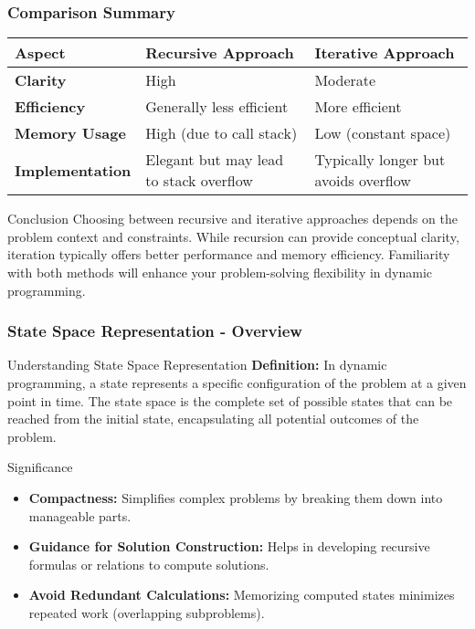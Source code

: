 \documentclass[aspectratio=169]{beamer}
\begin{document}
\begin{frame}
  \frametitle{Comparison Summary}
  \begin{tabular}{|l|l|l|}
    \hline
    Aspect & Recursive Approach & Iterative Approach \\
    \hline
    \textbf{Clarity} & High & Moderate \\
    \hline
    \textbf{Efficiency} & Generally less efficient & More efficient \\
    \hline
    \textbf{Memory Usage} & High (due to call stack) & Low (constant space) \\
    \hline
    \textbf{Implementation} & Elegant but may lead to stack overflow & Typically longer but avoids overflow \\
    \hline
  \end{tabular}
  
  \begin{block}{Conclusion}
    Choosing between recursive and iterative approaches depends on the problem context and constraints. While recursion can provide conceptual clarity, iteration typically offers better performance and memory efficiency. Familiarity with both methods will enhance your problem-solving flexibility in dynamic programming.
  \end{block}
\end{frame}

\begin{frame}[fragile]
    \frametitle{State Space Representation - Overview}
    \begin{block}{Understanding State Space Representation}
        \textbf{Definition:}  
        In dynamic programming, a state represents a specific configuration of the problem at a given point in time. The state space is the complete set of possible states that can be reached from the initial state, encapsulating all potential outcomes of the problem.
    \end{block}
    \begin{block}{Significance}
        \begin{itemize}
            \item \textbf{Compactness:} Simplifies complex problems by breaking them down into manageable parts.
            \item \textbf{Guidance for Solution Construction:} Helps in developing recursive formulas or relations to compute solutions.
            \item \textbf{Avoid Redundant Calculations:} Memorizing computed states minimizes repeated work (overlapping subproblems).
        \end{itemize}
    \end{block}
\end{frame}
\end{document}
